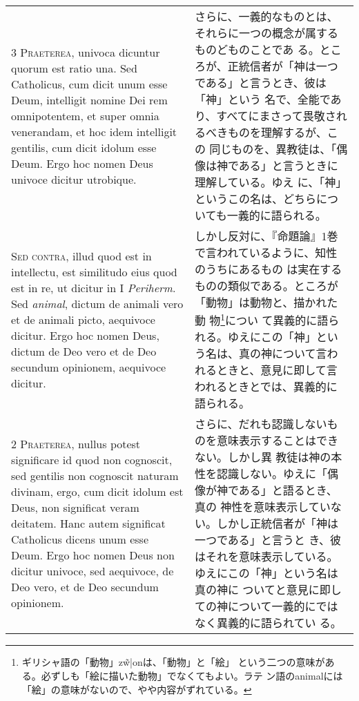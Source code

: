 \documentclass[10pt]{jsarticle} %
\begin{document}
\begin{longtable}{p{21em}p{21em}}
\\


{\scshape 3 Praeterea}, univoca dicuntur quorum est
ratio una. Sed Catholicus, cum dicit unum esse Deum, intelligit nomine
Dei rem omnipotentem, et super omnia venerandam, et hoc idem intelligit
gentilis, cum dicit idolum esse Deum. Ergo hoc nomen Deus univoce
dicitur utrobique.

&

さらに、一義的なものとは、それらに一つの概念が属するものどものことであ
る。ところが、正統信者が「神は一つである」と言うとき、彼は「神」という
名で、全能であり、すべてにまさって畏敬されるべきものを理解するが、この
同じものを、異教徒は、「偶像は神である」と言うときに理解している。ゆえ
に、「神」というこの名は、どちらについても一義的に語られる。


\\


{\scshape Sed contra}, illud quod est in intellectu, est similitudo eius
quod est in re, ut dicitur in I {\itshape Periherm}. Sed {\itshape
animal}, dictum de animali vero et de animali picto, aequivoce
dicitur. Ergo hoc nomen Deus, dictum de Deo vero et de Deo secundum
opinionem, aequivoce dicitur.

& 


しかし反対に、『命題論』1巻で言われているように、知性のうちにあるもの
は実在するものの類似である。ところが「動物」は動物と、描かれた動
物\footnote{ギリシャ語の「動物」\textgreek{z\~w|on}は、「動物」と「絵」
という二つの意味がある。必ずしも「絵に描いた動物」でなくてもよい。ラテ
ン語のanimalには「絵」の意味がないので、やや内容がずれている。}につい
て異義的に語られる。ゆえにこの「神」という名は、真の神について言わ
れるときと、意見に即して言われるときとでは、異義的に語られる。

\\

{\scshape 2 Praeterea}, nullus potest significare id quod non
cognoscit, sed gentilis non cognoscit naturam divinam, ergo, cum dicit
idolum est Deus, non significat veram deitatem. Hanc autem significat
Catholicus dicens unum esse Deum. Ergo hoc nomen Deus non dicitur
univoce, sed aequivoce, de Deo vero, et de Deo secundum opinionem.

&

さらに、だれも認識しないものを意味表示することはできない。しかし異
教徒は神の本性を認識しない。ゆえに「偶像が神である」と語るとき、真の
神性を意味表示していない。しかし正統信者が「神は一つである」と言うと
き、彼はそれを意味表示している。ゆえにこの「神」という名は真の神に
ついてと意見に即しての神について一義的にではなく異義的に語られてい
る。


\end{longtable}
\end{document}
